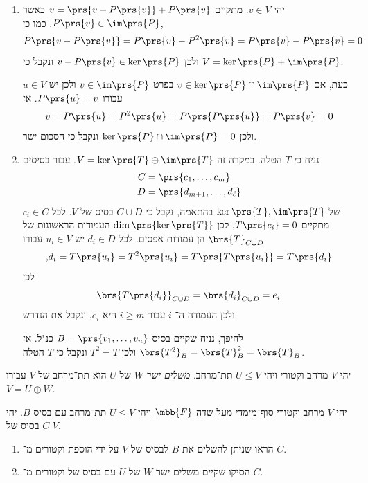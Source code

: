 \documentclass[a4paper,10pt,twoside,openany]{book}
\begin{document}
\begin{solution}
\begin{enumerate}
\item יהי
$v \in V$.
מתקיים
$v = \prs{v - P\prs{v}} + P\prs{v}$
כאשר
$P\prs{v} \in \im\prs{P}$.
כמו כן,
\[P\prs{v - P\prs{v}} = P\prs{v} - P^2\prs{v} = P\prs{v} - P\prs{v} = 0\]
ולכן
$v- P\prs{v} \in \ker\prs{P}$
ונקבל כי
$V = \ker\prs{P} + \im\prs{P}$.

כעת, אם
$v \in \ker\prs{P} \cap \im\prs{P}$
בפרט
$v \in \im\prs{P}$
ולכן יש
$u \in V$
עבורו
$P\prs{u} = v$.
אז
\[v = P\prs{u} = P^2\prs{u} = P\prs{P\prs{u}} = P\prs{v} = 0\]
ולכן
$\ker\prs{P} \cap \im\prs{P} = 0$
ונקבל כי הסכום ישר.

\item
נניח כי
$T$
הטלה. במקרה זה
$V = \ker\prs{T} \oplus \im\prs{T}$.
עבור בסיסים
\begin{align*}
C &= \prs{c_1, \ldots, c_m} \\
D &= \prs{d_{m+1}, \ldots, d_\ell}
\end{align*}
של
$\ker\prs{T}, \im\prs{T}$
בהתאמה, נקבל כי
$C \cup D$
בסיס של
$V$.
לכל
$c_i \in C $
מתקיים
$T\prs{c_i} = 0$,
לכן
$\dim\prs{\ker\prs{T}}$
העמודות הראשונות של
$\brs{T}_{C \cup D}$
הן עמודות אפסים.
לכל
$d_i \in D$
יש
$u_i \in V$
עבורו
\[\text{,} d_i = T\prs{u_i} = T^2\prs{u_i} = T\prs{T\prs{u_i}} = T\prs{d_i}\]
לכן
\[\brs{T\prs{d_i}}_{C \cup D} = \brs{d_i}_{C \cup D} = e_i\]
ולכן העמודה ה־%
$i$
עבור
$i \geq m$
היא
$e_i$,
ונקבל את הנדרש.

להיפך, נניח שקיים בסיס
$B = \prs{v_1, \ldots, v_n}$
כנ"ל. אז
$\brs{T^2}_B = \brs{T}_B^2 = \brs{T}_B$
ולכן
$T^2 = T$
ונקבל כי
$T$
הטלה.
\end{enumerate}
\end{solution}

\begin{definition}
יהי
$V$
מרחב וקטורי ויהי
$U \leq V$
תת־מרחב.
\emph{משלים ישר}
$W$
של
$U$
הוא תת־מרחב של
$V$
עבורו
$V = U \oplus W$.
\end{definition}

\begin{exercisechap}
יהי
$V$
מרחב וקטורי סוף־מימדי מעל שדה
$\mbb{F}$
ויהי
$U \leq V$
תת־מרחב עם בסיס
$B$.
יהי
$C$
בסיס של
$V$.
\begin{enumerate}
\item הראו שניתן להשלים את
$B$
לבסיס של
$V$
על ידי הוספת וקטורים מ־%
$C$.

\item הסיקו שקיים משלים ישר
$W$
של
$U$
עם בסיס של וקטורים מ־%
$C$.
\end{enumerate}
\end{exercisechap}
\end{document}

